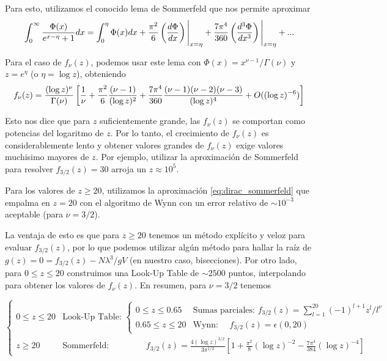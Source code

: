 Para esto, utilizamos el conocido lema de Sommerfeld\cite{BOOK:PATHRIA} que nos permite aproximar
\begin{equation}{\label{eq:sommerfeld}}
 \int_0^\infty \frac{\Phi(x)}{e^{x-\eta}+1}dx = \int_0^\eta \Phi(x) dx + \frac{\pi^2}{6}\left( \frac{d\Phi}{dx} \right)\Bigg|_{x=\eta} +
 \frac{7\pi^4}{360}\left( \frac{d^3\Phi}{dx^3} \right)\Bigg|_{x=\eta} + ...
\end{equation}

Para el caso de $f_\nu(z)$, podemos usar este lema con $\Phi(x) = x^{\nu-1}/\Gamma(\nu)$ y $z = e^{\eta}$ (o $\eta = \log z$), obteniendo
\begin{equation}{\label{eq:dirac_sommerfeld}}
f_\nu(z) = \frac{(\log z)^\nu}{\Gamma(\nu)}\left[ \frac{1}{\nu} + \frac{\pi^2}{6}\frac{(\nu - 1)}{(\log z)^2} + \frac{7\pi^4}{360}\frac{(\nu - 1)(\nu - 2)(\nu - 3)}{(\log z)^4}
+ O((\log z)^{-6})  \right]
\end{equation}

Esto nos dice que para $z$ suficientemente grande, las $f_\nu(z)$ se comportan como potencias del logaritmo de $z$.
Por lo tanto, el crecimiento de $f_\nu(z)$ es considerablemente lento y obtener valores grandes de $f_\nu(z)$ exige valores muchisimo mayores de $z$.
Por ejemplo, utilizar la aproximación de Sommerfeld para resolver $f_{3/2}(z) = 30$ arroja un $z\approx 10^5$.

Para los valores de $z\geq 20$, utilizamos la aproximación \eqref{eq:dirac_sommerfeld} que empalma en $z=20$ con el algoritmo de Wynn con un error relativo de
$\sim10^{-3}$ aceptable (para $\nu=3/2$).

La ventaja de esto es que para $z\geq 20$ tenemos un método explícito y veloz para evaluar $f_{3/2}(z)$, por lo que podemos utilizar algún método para hallar la
raíz de $g(z) = 0 = f_{3/2}(z) - N\lambda^3/gV$ (en nuestro caso, bisecciones).
Por otro lado, para $0\leq z\leq 20$ construimos una Look-Up Table de $\sim 2500$ puntos, interpolando para obtener los valores de $f_\nu(z)$.
En resumen, para $\nu=3/2$ tenemos

\[ \left\{\begin{matrix}
  0 \leq z \leq 20 & \text{Look-Up Table: } \left\{\begin{matrix}
		    0 \leq z \leq 0.65 & \text{Sumas parciales: } f_{3/2}(z) = \sum_{l=1}^{20} (-1)^{l+1} z^l/l^\nu \\
		    0.65 \leq z \leq 20 & \text{Wynn: } \quad f_{3/2}(z) = \epsilon(0,20)
		    \end{matrix}\right. \\
 z\geq 20 & \text{Sommerfeld: } \qquad \qquad f_{3/2}(z) = \frac{4(\log z)^{3/2}}{3\pi^{1/2}}\left[ 1 + \frac{\pi^2}{8}(\log z)^{-2} - \frac{7\pi^4}{384}(\log z)^{-4}  \right]
 \end{matrix} \right.
\]

